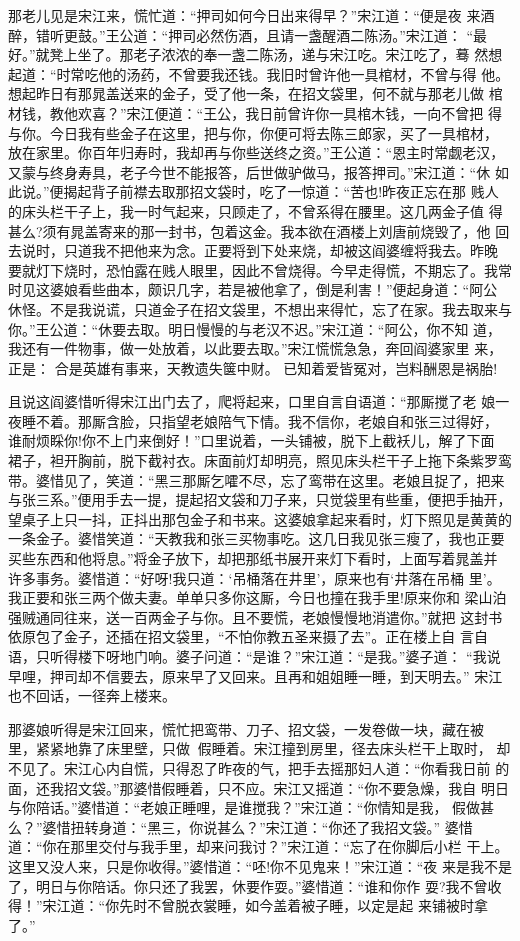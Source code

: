 那老儿见是宋江来，慌忙道：“押司如何今日出来得早？”宋江道：“便是夜
来酒醉，错听更鼓。”王公道：“押司必然伤酒，且请一盏醒酒二陈汤。”宋江道：
“最好。”就凳上坐了。那老子浓浓的奉一盏二陈汤，递与宋江吃。宋江吃了，蓦
然想起道：“时常吃他的汤药，不曾要我还钱。我旧时曾许他一具棺材，不曾与得
他。想起昨日有那晁盖送来的金子，受了他一条，在招文袋里，何不就与那老儿做
棺材钱，教他欢喜？”宋江便道：“王公，我日前曾许你一具棺木钱，一向不曾把
得与你。今日我有些金子在这里，把与你，你便可将去陈三郎家，买了一具棺材，
放在家里。你百年归寿时，我却再与你些送终之资。”王公道：“恩主时常觑老汉，
又蒙与终身寿具，老子今世不能报答，后世做驴做马，报答押司。”宋江道：“休
如此说。”便揭起背子前襟去取那招文袋时，吃了一惊道：“苦也!昨夜正忘在那
贱人的床头栏干子上，我一时气起来，只顾走了，不曾系得在腰里。这几两金子值
得甚么?须有晁盖寄来的那一封书，包着这金。我本欲在酒楼上刘唐前烧毁了，他
回去说时，只道我不把他来为念。正要将到下处来烧，却被这阎婆缠将我去。昨晚
要就灯下烧时，恐怕露在贱人眼里，因此不曾烧得。今早走得慌，不期忘了。我常
时见这婆娘看些曲本，颇识几字，若是被他拿了，倒是利害！”便起身道：“阿公
休怪。不是我说谎，只道金子在招文袋里，不想出来得忙，忘了在家。我去取来与
你。”王公道：“休要去取。明日慢慢的与老汉不迟。”宋江道：“阿公，你不知
道，我还有一件物事，做一处放着，以此要去取。”宋江慌慌急急，奔回阎婆家里
来，正是：
合是英雄有事来，天教遗失箧中财。
已知着爱皆冤对，岂料酬恩是祸胎!

且说这阎婆惜听得宋江出门去了，爬将起来，口里自言自语道：“那厮搅了老
娘一夜睡不着。那厮含脸，只指望老娘陪气下情。我不信你，老娘自和张三过得好，
谁耐烦睬你!你不上门来倒好！”口里说着，一头铺被，脱下上截袄儿，解了下面
裙子，袒开胸前，脱下截衬衣。床面前灯却明亮，照见床头栏干子上拖下条紫罗鸾
带。婆惜见了，笑道：“黑三那厮乞嚯不尽，忘了鸾带在这里。老娘且捉了，把来
与张三系。”便用手去一提，提起招文袋和刀子来，只觉袋里有些重，便把手抽开，
望桌子上只一抖，正抖出那包金子和书来。这婆娘拿起来看时，灯下照见是黄黄的
一条金子。婆惜笑道：“天教我和张三买物事吃。这几日我见张三瘦了，我也正要
买些东西和他将息。”将金子放下，却把那纸书展开来灯下看时，上面写着晁盖并
许多事务。婆惜道：“好呀!我只道：‘吊桶落在井里’，原来也有‘井落在吊桶
里’。我正要和张三两个做夫妻。单单只多你这厮，今日也撞在我手里!原来你和
梁山泊强贼通同往来，送一百两金子与你。且不要慌，老娘慢慢地消遣你。”就把
这封书依原包了金子，还插在招文袋里，“不怕你教五圣来摄了去”。正在楼上自
言自语，只听得楼下呀地门响。婆子问道：“是谁？”宋江道：“是我。”婆子道：
“我说早哩，押司却不信要去，原来早了又回来。且再和姐姐睡一睡，到天明去。”
宋江也不回话，一径奔上楼来。

那婆娘听得是宋江回来，慌忙把鸾带、刀子、招文袋，一发卷做一块，藏在被
里，紧紧地靠了床里壁，只做假睡着。宋江撞到房里，径去床头栏干上取时，
却不见了。宋江心内自慌，只得忍了昨夜的气，把手去摇那妇人道：“你看我日前
的面，还我招文袋。”那婆惜假睡着，只不应。宋江又摇道：“你不要急燥，我自
明日与你陪话。”婆惜道：“老娘正睡哩，是谁搅我？”宋江道：“你情知是我，
假做甚么？”婆惜扭转身道：“黑三，你说甚么？”宋江道：“你还了我招文袋。”
婆惜道：“你在那里交付与我手里，却来问我讨？”宋江道：“忘了在你脚后小栏
干上。这里又没人来，只是你收得。”婆惜道：“呸!你不见鬼来！”宋江道：“夜
来是我不是了，明日与你陪话。你只还了我罢，休要作耍。”婆惜道：“谁和你作
耍?我不曾收得！”宋江道：“你先时不曾脱衣裳睡，如今盖着被子睡，以定是起
来铺被时拿了。”

